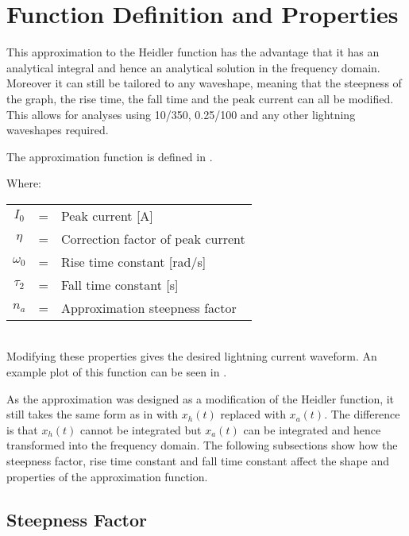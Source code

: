 \section{Function Definition and Properties}
\label{sec:approx_function_definition_and_properties}

This approximation to the Heidler function has the advantage that it has an analytical integral and hence an analytical solution in the frequency domain. Moreover it can still be tailored to any waveshape, meaning that the steepness of the graph, the rise time, the fall time and the peak current can all be modified. This allows for analyses using 10/350, 0.25/100 and any other lightning waveshapes required.

The approximation function is defined in .

Where: \\
\begin{tabular}{cll}
    $I_0$ & = & Peak current [A] \\
    $\eta$ & = & Correction factor of peak current \\
    $\omega_0$ & = & Rise time constant [rad/s] \\
    $\tau_2$ & = & Fall time constant [s] \\
    $n_a$ & = & Approximation steepness factor
\end{tabular}\\

Modifying these properties gives the desired lightning current waveform. An example plot of this function can be seen in .

As the approximation was designed as a modification of the Heidler function, it still takes the same form as in  with $x_h \left( t \right)$ replaced with $x_a \left( t \right)$. The difference is that $x_h \left( t \right)$ cannot be integrated but $x_a \left( t \right)$ can be integrated and hence transformed into the frequency domain. The following subsections show how the steepness factor, rise time constant and fall time constant affect the shape and properties of the approximation function.

\subsection{Steepness Factor}
\label{sub:approx_steepness_factor}

